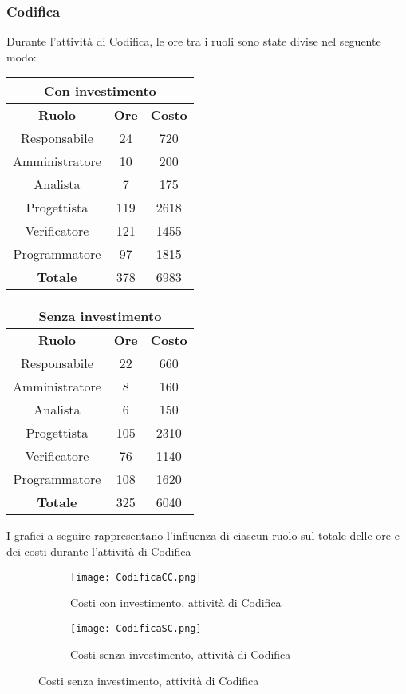 \documentclass{scalatekids-article}
\begin{document}
\subsubsection{Codifica}
Durante l'attività di Codifica, le ore tra i ruoli sono state divise nel seguente modo:
\begin{center}
  \normalsize
  \begin{tabular}{| c | c | c |}
    \hline
    \multicolumn{3}{|c|}{\textbf{Con investimento}}\\
    \hline
    \textbf{Ruolo} & \textbf{Ore} & \textbf{Costo}\\
    \hline
    Responsabile & 24 & 720\\
    Amministratore & 10 & 200\\
    Analista & 7 & 175\\
    Progettista & 119 & 2618\\
    Verificatore & 121 & 1455 \\
    Programmatore & 97 & 1815 \\
    \hline
    \textbf{Totale} & 378 & 6983\\
    \hline
  \end{tabular}
  \qquad
  \begin{tabular}{| c | c | c |}
    \hline
    \multicolumn{3}{|c|}{\textbf{Senza investimento}}\\
    \hline
    \textbf{Ruolo} & \textbf{Ore} & \textbf{Costo}\\
    \hline
    Responsabile & 22 & 660\\
    Amministratore & 8 & 160\\
    Analista & 6 & 150\\
    Progettista & 105 & 2310\\
    Verificatore & 76 & 1140 \\
    Programmatore & 108 & 1620 \\
    \hline
    \textbf{Totale} & 325 & 6040\\
    \hline
  \end{tabular}
\end{center}
I grafici a seguire rappresentano l'influenza di ciascun ruolo sul totale delle ore e dei costi durante l'attività di Codifica
\begin{figure}[H]
  \begin{subfigure}[H]{0.47\textwidth}
    \texttt{[image: CodificaCC.png]}
    \caption{Costi con investimento, attività di Codifica}
  \end{subfigure}
  \qquad
  \begin{subfigure}[H]{0.47\textwidth}
    \texttt{[image: CodificaSC.png]}
    \caption{Costi senza investimento, attività di Codifica}
  \end{subfigure}
\end{figure}
\newpage
\end{document}
